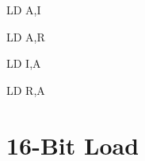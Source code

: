 \documentclass[12pt,twoside,openright,a4paper]{book}
\begin{document}
\begin{instrtable}
	\begin{instruction}{LD A,I} 
		\SkipToOpCode
	\end{instruction}

	\begin{instruction}{LD A,R} 
		\SkipToOpCode
	\end{instruction}

	\begin{instruction}{LD I,A} 
			\Flags{\FN}{\FN}{\FN}{\FN}{\FN}{\FN}
		\SkipToOpCode
	\end{instruction}

	\begin{lastinstruction}{LD R,A} 
			\Flags{\FN}{\FN}{\FN}{\FN}{\FN}{\FN}
		\SkipToOpCode
	\end{lastinstruction}

\end{instrtable}


\section{16-Bit Load}
\end{document}

